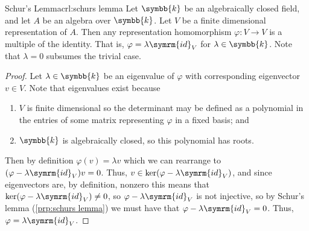\documentclass[fleqn]{NotesClass}
\renewcommand{\field}{\symbb{k}}
\newcommand{\id}{\symrm{id}}
\begin{document}
    \begin{crl}{Schur's Lemma}{crl:schurs lemma}
        Let \(\field\) be an algebraically closed field, and let \(A\) be an algebra over \(\field\).
        Let \(V\) be a finite dimensional representation of \(A\).
        Then any representation homomorphism \(\varphi \colon V \to V\) is a multiple of the identity.
        That is, \(\varphi = \lambda \id_V\) for \(\lambda \in \field\).
        Note that \(\lambda = 0\) subsumes the trivial case.
        \begin{proof}
            Let \(\lambda \in \field\) be an eigenvalue of \(\varphi\) with corresponding eigenvector \(v \in V\).
            Note that eigenvalues exist because
            \begin{enumerate}[label={\alph*)}]
                \item \(V\) is finite dimensional so the determinant may be defined as a polynomial in the entries of some matrix representing \(\varphi\) in a fixed basis; and
                \item \(\field\) is algebraically closed, so this polynomial has roots.
            \end{enumerate}
            Then by definition \(\varphi(v) = \lambda v\) which we can rearrange to \((\varphi - \lambda \id_V) v = 0\).
            Thus, \(v \in \ker(\varphi - \lambda \id_V)\), and since eigenvectors are, by definition, nonzero this means that \(\ker(\varphi - \lambda \id_V) \ne 0\), so \(\varphi - \lambda \id_V\) is not injective, so by Schur's lemma (\cref{prp:schurs lemma}) we must have that \(\varphi - \lambda \id_V = 0\).
            Thus, \(\varphi = \lambda \id_V\).
        \end{proof}
    \end{crl}
    
\end{document}
